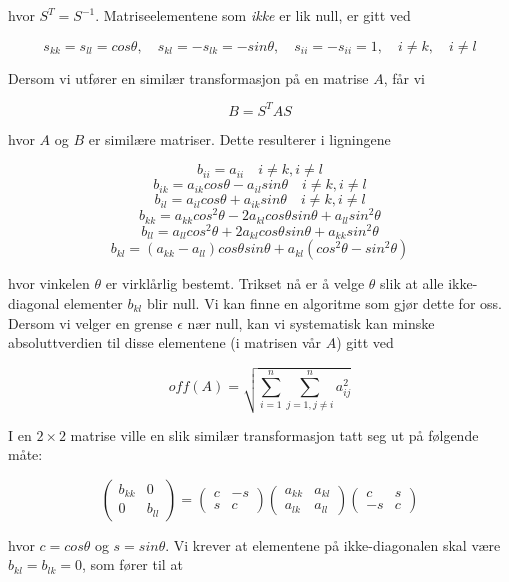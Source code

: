 \documentclass{article}
\begin{document}
hvor $S^T = S^{-1}$. Matriseelementene som \textit{ikke} er lik null, er gitt ved 

\[s_{kk} = s_{ll} = cos \theta, \quad s_{kl} = -s_{lk} = -sin\theta, \quad s_{ii} = -s_{ii} = 1, \quad i \neq k, \quad i \neq l \]

Dersom vi utfører en similær transformasjon på en matrise $A$, får vi 

\[B = S^T A S\]

hvor $A$ og $B$ er similære matriser. Dette resulterer i ligningene

\[b_{ii} = a_{ii} \quad i \neq k, i\neq l  \]
\[b_{ik} = a_{ik} cos\theta - a_{il} sin \theta \quad i \neq k, i \neq l \]
\[b_{il} = a_{il} cos \theta + a_{ik} sin \theta \quad i \neq k, i \neq l \]
\[ b_{kk} = a_{kk} cos^2\theta - 2a_{kl} cos \theta sin \theta + a_{ll} sin^2 \theta \]
\[ b_{ll} = a_ {ll}cos^2\theta + 2a_{kl} cos \theta sin\theta + a_{kk} sin^2 \theta \]
\[ b_{kl} = (a_{kk} - a_{ll} ) cos \theta sin \theta + a_{kl}(cos^2 \theta - sin^2 \theta ) \]

hvor vinkelen $\theta$ er virklårlig bestemt. Trikset nå er å velge $\theta$ slik at alle ikke-diagonal elementer $b_{kl}$ blir null. Vi kan finne en algoritme som gjør dette for oss. Dersom vi velger en grense $\epsilon$ nær null, kan vi systematisk kan minske absoluttverdien til disse elementene (i matrisen vår $A$) gitt ved

\[off(A) = \sqrt{\sum_{i=1}^n \sum_{j=1, j\neq i}^n a_{ij}^2 } \]

I en $2 \times 2$ matrise ville en slik similær transformasjon tatt seg ut på følgende måte: 

\[\begin{pmatrix} 
b_{kk} &0 \\ 
0& b_{ll} \end{pmatrix} =
 \begin{pmatrix} 
 c & -s\\ 
 s & c \end{pmatrix}
 \begin{pmatrix} 
 a_{kk} & a_{kl}\\
  a_{lk}& a_{ll} \end{pmatrix}
  \begin{pmatrix} 
  c & s\\ 
  -s &c \end{pmatrix}\]

hvor $c = cos\theta$ og $s = sin\theta$. Vi krever at elementene på ikke-diagonalen skal være $b_{kl} = b_{lk} = 0$, som fører til at
\end{document}
